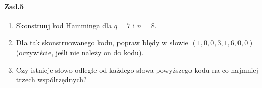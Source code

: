 \documentclass[a4paper,12pt]{article}
\theoremstyle{definition}%
\theoremstyle{definition}
\theoremstyle{problem}
\begin{document}
\paragraph{Zad.5}
\begin{enumerate}[label=\alph*)]
\item Skonstruuj kod Hamminga dla $q = 7$ i $n = 8$.
\item  Dla tak skonstruowanego kodu, popraw błędy w słowie $(1,0,0,3,1,6,0,0)$ (oczywiście, jeśli nie należy on do kodu).
\item Czy istnieje słowo odległe od każdego słowa powyższego kodu na co najmniej trzech współrzędnych?
\end{enumerate}


\end{document}
